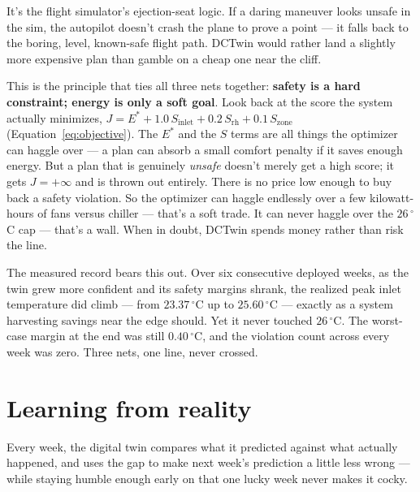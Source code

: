 \documentclass[11pt]{report}
\begin{document}
\begin{analogy}
It's the flight simulator's ejection-seat logic. If a daring maneuver looks unsafe in the sim, the autopilot doesn't crash the plane to prove a point --- it falls back to the boring, level, known-safe flight path. DCTwin would rather land a slightly more expensive plan than gamble on a cheap one near the cliff.
\end{analogy}

This is the principle that ties all three nets together: \textbf{safety is a hard constraint; energy is only a soft goal}. Look back at the score the system actually minimizes, $J = E^{*} + 1.0\,S_{\text{inlet}} + 0.2\,S_{\text{rh}} + 0.1\,S_{\text{zone}}$ (Equation~\ref{eq:objective}). The $E^{*}$ and the $S$ terms are all things the optimizer can haggle over --- a plan can absorb a small comfort penalty if it saves enough energy. But a plan that is genuinely \emph{unsafe} doesn't merely get a high score; it gets $J = +\infty$ and is thrown out entirely. There is no price low enough to buy back a safety violation. So the optimizer can haggle endlessly over a few kilowatt-hours of fans versus chiller --- that's a soft trade. It can never haggle over the $26\,^\circ$C cap --- that's a wall. When in doubt, DCTwin spends money rather than risk the line.

The measured record bears this out. Over six consecutive deployed weeks, as the twin grew more confident and its safety margins shrank, the realized peak inlet temperature did climb --- from $23.37\,^{\circ}$C up to $25.60\,^{\circ}$C --- exactly as a system harvesting savings near the edge should. Yet it never touched $26\,^{\circ}$C. The worst-case margin at the end was still $0.40\,^{\circ}$C, and the violation count across every week was zero. Three nets, one line, never crossed.

\section{Learning from reality}
\label{sec:learning}

\begin{keyidea}
Every week, the digital twin compares what it predicted against what actually happened, and uses the gap to make next week's prediction a little less wrong --- while staying humble enough early on that one lucky week never makes it cocky.
\end{keyidea}
\end{document}
